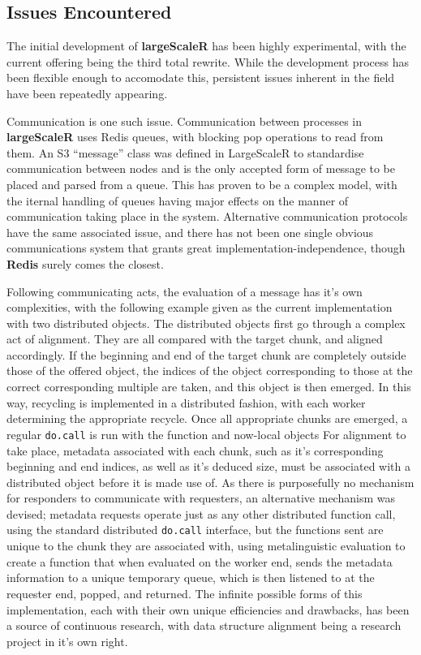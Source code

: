 \subsection{Issues Encountered}\label{sec:sys-imp}

The initial development of \textbf{largeScaleR} has been highly experimental, with the current offering being the third total rewrite.
While the development process has been flexible enough to accomodate this, persistent issues inherent in the field have been repeatedly appearing.

Communication is one such issue.
Communication between processes in \textbf{largeScaleR} uses Redis queues, with blocking pop operations to read from them.
An S3 ``message'' class was defined in LargeScaleR to standardise communication between nodes and is the only accepted form of message to be placed and parsed from a queue.
This has proven to be a complex model, with the iternal handling of queues having major effects on the manner of communication taking place in the system.
Alternative communication protocols have the same associated issue, and there has not been one single obvious communications system that grants great implementation-independence, though \textbf{Redis} surely comes the closest\cite{sanfilippo2009redis}.

Following communicating acts, the evaluation of a message has it's own complexities, with the following example given as the current implementation with two distributed objects.
The distributed objects first go through a complex act of alignment.
They are all compared with the target chunk, and aligned accordingly.
If the beginning and end of the target chunk are completely outside those of the offered object, the indices of the object corresponding to those at the correct corresponding multiple are taken, and this object is then emerged.
In this way, recycling is implemented in a distributed fashion, with each worker determining the appropriate recycle.
Once all appropriate chunks are emerged, a regular \texttt{do.call} is run with the function and now-local objects
For alignment to take place, metadata associated with each chunk, such as it's corresponding beginning and end indices, as well as it's deduced size, must be associated with a distributed object before it is made use of.
As there is purposefully no mechanism for responders to communicate with requesters, an alternative mechanism was devised; metadata requests operate just as any other distributed function call, using the standard distributed \texttt{do.call} interface, but the functions sent are unique to the chunk they are associated with, using metalinguistic evaluation to create a function that when evaluated on the worker end, sends the metadata information to a unique temporary queue, which is then listened to at the requester end, popped, and returned.
The infinite possible forms of this implementation, each with their own unique efficiencies and drawbacks, has been a source of continuous research, with data structure alignment being a research project in it's own right\cite{bryant2015computer}\cite{li1991data}.

